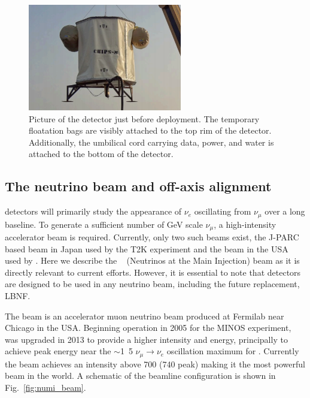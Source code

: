 \begin{figure} %
    \includegraphics[width=0.6\textwidth]{diagrams/4-chips/chips_m.png}
    \caption[Picture of the \chipsm detector.]
    {Picture of the \chipsm detector just before deployment. The temporary floatation bags are
        visibly attached to the top rim of the detector. Additionally, the umbilical cord carrying
        data, power, and water is attached to the bottom of the detector.}
    \label{fig:chips_m}
\end{figure}

\subsection{The neutrino beam and off-axis alignment} %
\label{sec:chips_concept_beam} %

\chips detectors will primarily study the appearance of $\nu_{e}$ oscillating from $\nu_{\mu}$
over a long baseline. To generate a sufficient number of GeV scale $\nu_{\mu}$, a high-intensity
accelerator beam is required. Currently, only two such beams exist, the J-PARC based beam in Japan
used by the T2K experiment and the \numi beam in the USA used by \nova. Here we describe the
\numi~\cite{adamson2016} (Neutrinos at the Main Injection) beam as it is directly relevant to
current \chips efforts. However, it is essential to note that \chips detectors are designed to be
used in any neutrino beam, including the future \numi replacement, LBNF.

The \numi beam is an accelerator muon neutrino beam produced at Fermilab near Chicago in the USA.
Beginning operation in 2005 for the MINOS experiment, \numi was upgraded in 2013 to provide a
higher intensity and energy, principally to achieve peak energy near the $\sim$\unit{1.5}{\GeV}
$\nu_{\mu}\rightarrow\nu_{e}$ oscillation maximum for \nova. Currently the \numi beam achieves an
intensity above \unit{700}{} (\unit{740}{} peak) making it the most powerful
beam in the world. A schematic of the \numi beamline configuration is shown in
Fig.~\ref{fig:numi_beam}.

